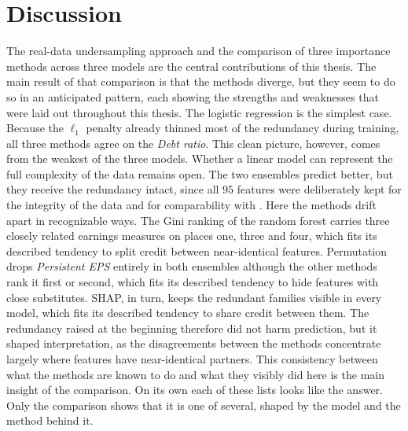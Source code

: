\chapter{Discussion}
\label{ch:discussion}

The real-data undersampling approach and the comparison of three importance
methods across three models are the central contributions of this thesis. The
main result of that comparison is that the methods diverge, but they seem to do
so in an anticipated pattern, each showing the strengths and weaknesses that
were laid out throughout this thesis. The logistic regression is the simplest case. 
Because the $\ell_1$ penalty
already thinned most of the redundancy during training, all three methods agree
on the \emph{Debt ratio}. This clean picture, however, comes from the weakest of the
three models. Whether a linear model can represent the full complexity of the
data remains open. The two ensembles predict better, but they receive the 
redundancy intact, since all $95$ features were deliberately kept for the integrity of the data and for
comparability with \textcite{wangliu2021}. Here the methods drift apart in
recognizable ways. The Gini ranking of the random forest carries three closely
related earnings measures on places one, three and four, which fits its described
tendency to split credit between near-identical features. Permutation drops
\emph{Persistent EPS} entirely in both ensembles although the other methods rank it
first or second, which fits its described tendency to hide features with close
substitutes. SHAP, in turn, keeps the redundant families visible in every model,
which fits its described tendency to share credit between them. The redundancy
raised at the beginning therefore did not harm prediction, but it shaped
interpretation, as the disagreements between the methods concentrate largely
where features have near-identical partners. This consistency between what the
methods are known to do and what they visibly did here is the main insight of
the comparison. On its own each of these lists looks like the answer. 
Only the comparison shows that it is one of several, shaped by the model 
and the method behind it.

